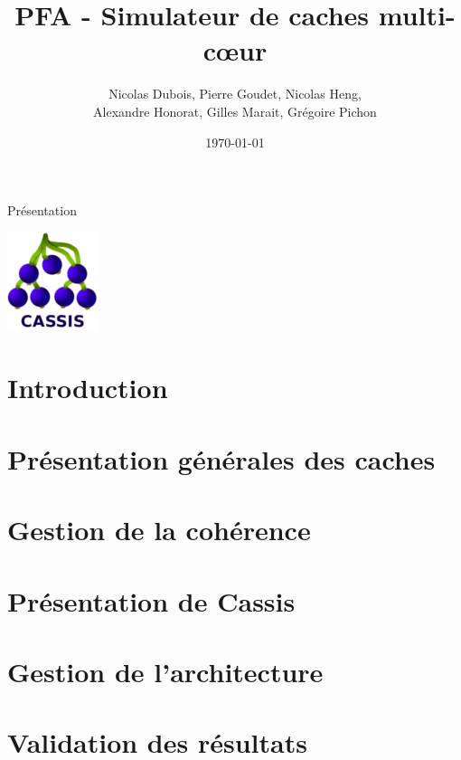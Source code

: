\documentclass{beamer}
\title[PFA - Simulateur de caches multi-c\oe ur]{PFA - Simulateur de caches multi-c\oe ur}
\author[]{Nicolas Dubois, Pierre Goudet, Nicolas Heng,\\Alexandre Honorat, Gilles Marait, Grégoire Pichon}
\institute[ENSEIRB-MATMECA]{ENSEIRB-MATMECA}
\date{\today}
\begin{document}
\setlength{\unitlength}{1cm}

\begin{frame}{Présentation}

\titlepage

\begin{center}
  \includegraphics[scale=.5]{images/cassis.png}
\end{center} 

\end{frame}



\section*{Introduction}



\section{Présentation générales des caches}


\section{Gestion de la cohérence}


\section{Présentation de Cassis}


\section{Gestion de l'architecture}


\section{Validation des résultats}

\end{document}
